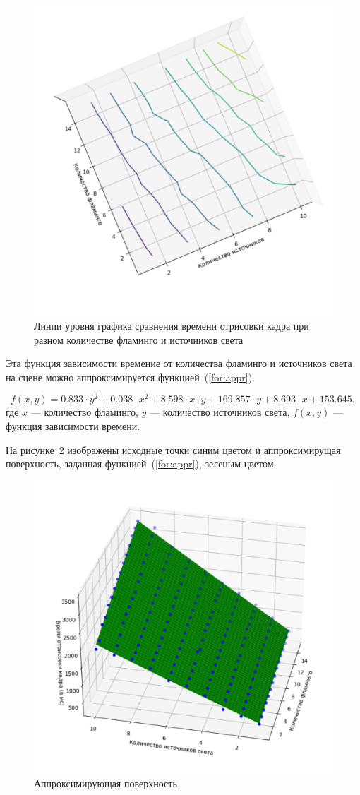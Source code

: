 \begin{figure}[h!]
	\centering
	\includegraphics[width=0.6\linewidth]{img/graph_up}
	\caption{Линии уровня графика сравнения времени отрисовки кадра при разном количестве фламинго и источников света}
	\label{fig:graph_up}
\end{figure}
\clearpage

Эта функция зависимости времение от количества фламинго и источников света на сцене можно аппроксимируется функцией~(\ref{for:appr}).

\begin{equation}
	\label{for:appr}
	f(x, y) = 0.833 \cdot y^2 + 0.038 \cdot x^2 + 8.598 \cdot x \cdot y + 169.857 \cdot y + 8.693 \cdot x + 153.645,
\end{equation}
где $x$ --- количество фламинго, $y$ --- количество источников света, $f(x, y)$ --- функция зависимости времени.

На рисунке~\ref{fig:appr} изображены исходные точки синим цветом и аппроксимирущая поверхность, заданная функцией~(\ref{for:appr}), зеленым цветом.

\begin{figure}[h!]
	\centering
	\includegraphics[width=0.75\linewidth]{img/appr}
	\caption{Аппроксимирующая поверхность}
	\label{fig:appr}
\end{figure}

